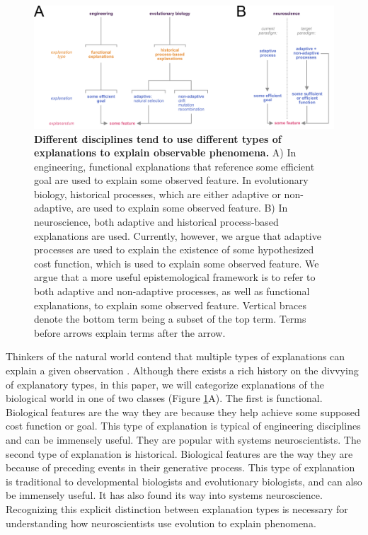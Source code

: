 \documentclass[twocolumn]{article}
\begin{document}
\begin{figure}[htp]
\centering
\includegraphics[width=15 cm]{fig_1.png}
\caption{\textbf{Different disciplines tend to use different types of explanations to explain observable phenomena.} A) In engineering, functional explanations that reference some efficient goal are used to explain some observed feature. In evolutionary biology, historical processes, which are either adaptive or non-adaptive, are used to explain some observed feature. B) In neuroscience, both adaptive and historical process-based explanations are used. Currently, however, we argue that adaptive processes are used to explain the existence of some hypothesized cost function, which is used to explain some observed feature. We argue that a more useful epistemological framework is to refer to both adaptive and non-adaptive processes, as well as functional explanations, to explain some observed feature. Vertical braces denote the bottom term being a subset of the top term. Terms before arrows explain terms after the arrow.}
\label{fig_explanations}
\end{figure}

Thinkers of the natural world contend that multiple types of explanations can explain a given observation \cite{2017physics, aristotle1998metaphysics, mayr_1961, tinbergen_1963, hladky_2013}. Although there exists a rich history on the divvying of explanatory types, in this paper, we will categorize explanations of the biological world in one of two classes (Figure \ref{fig_explanations}A). The first is functional. Biological features are the way they are because they help achieve some supposed cost function or goal. This type of explanation is typical of engineering disciplines and can be immensely useful. They are popular with systems neuroscientists. The second type of explanation is historical. Biological features are the way they are because of preceding events in their generative process. This type of explanation is traditional to developmental biologists and evolutionary biologists, and can also be immensely useful. It has also found its way into systems neuroscience. Recognizing this explicit distinction between explanation types is necessary for understanding how neuroscientists use evolution to explain phenomena. 
\end{document}

